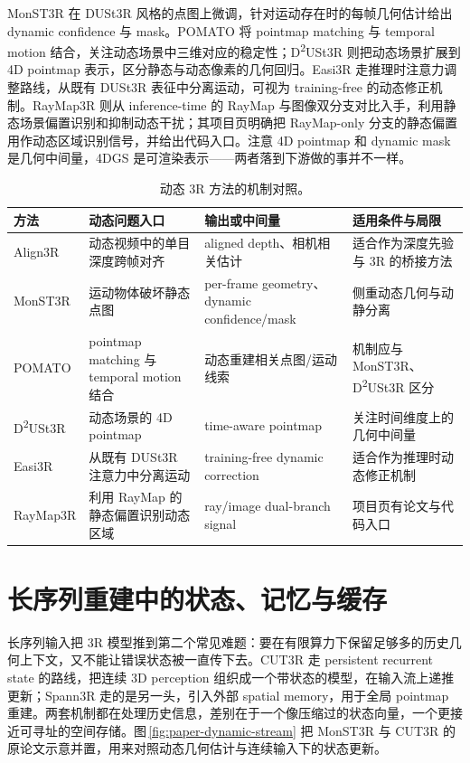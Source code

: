 \documentclass[UTF8,a4paper,zihao=-4,fontset=windows]{ctexart}
\begin{document}
MonST3R 在 DUSt3R 风格的点图上微调，针对运动存在时的每帧几何估计给出 dynamic confidence 与 mask\citep{monst3r}。POMATO 将 pointmap matching 与 temporal motion 结合，关注动态场景中三维对应的稳定性；D\textsuperscript{2}USt3R 则把动态场景扩展到 4D pointmap 表示，区分静态与动态像素的几何回归\citep{pomato,d2ust3r}。Easi3R 走推理时注意力调整路线，从既有 DUSt3R 表征中分离运动，可视为 training-free 的动态修正机制\citep{easi3r}。RayMap3R 则从 inference-time 的 RayMap 与图像双分支对比入手，利用静态场景偏置识别和抑制动态干扰；其项目页明确把 RayMap-only 分支的静态偏置用作动态区域识别信号，并给出代码入口\citep{raymap3r}。注意 4D pointmap 和 dynamic mask 是几何中间量，4DGS 是可渲染表示——两者落到下游做的事并不一样。

\begin{table}[t]
\centering
\small
\caption{动态 3R 方法的机制对照。}
\label{tab:dynamic}
\begin{tabularx}{\textwidth}{p{2.5cm}Y Y Y}
\toprule
方法 & 动态问题入口 & 输出或中间量 & 适用条件与局限 \\
\midrule
Align3R & 动态视频中的单目深度跨帧对齐 & aligned depth、相机相关估计 & 适合作为深度先验与 3R 的桥接方法 \\
MonST3R & 运动物体破坏静态点图 & per-frame geometry、dynamic confidence/mask & 侧重动态几何与动静分离 \\
POMATO & pointmap matching 与 temporal motion 结合 & 动态重建相关点图/运动线索 & 机制应与 MonST3R、D\textsuperscript{2}USt3R 区分 \\
D\textsuperscript{2}USt3R & 动态场景的 4D pointmap & time-aware pointmap & 关注时间维度上的几何中间量 \\
Easi3R & 从既有 DUSt3R 注意力中分离运动 & training-free dynamic correction & 适合作为推理时动态修正机制 \\
RayMap3R & 利用 RayMap 的静态偏置识别动态区域 & ray/image dual-branch signal & 项目页有论文与代码入口 \\
\bottomrule
\end{tabularx}
\end{table}

\section{长序列重建中的状态、记忆与缓存}

长序列输入把 3R 模型推到第二个常见难题：要在有限算力下保留足够多的历史几何上下文，又不能让错误状态被一直传下去。CUT3R 走 persistent recurrent state 的路线，把连续 3D perception 组织成一个带状态的模型，在输入流上递推更新\citep{cut3r}；Spann3R 走的是另一头，引入外部 spatial memory，用于全局 pointmap 重建\citep{spann3r}。两套机制都在处理历史信息，差别在于一个像压缩过的状态向量，一个更接近可寻址的空间存储。图\,\ref{fig:paper-dynamic-stream} 把 MonST3R 与 CUT3R 的原论文示意并置，用来对照动态几何估计与连续输入下的状态更新。
\end{document}
